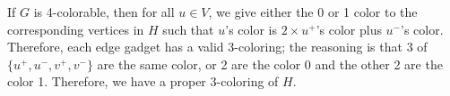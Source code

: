 \documentclass[10pt]{article}
\begin{document}
\begin{enumerate}
\par If $G$ is 4-colorable, then for all $u \in V$, we give either the 0 or 1 color to the corresponding vertices in $H$ such that $u$'s color is $2 \times u^+$'s color plus $u^-$'s color. Therefore, each edge gadget has a valid 3-coloring; the reasoning is that 3 of $\{u^+, u^-, v^+, v^-\}$ are the same color, or 2 are the color 0 and the other 2 are the color 1. Therefore, we have a proper 3-coloring of $H$.

\end{enumerate}
\end{document}
